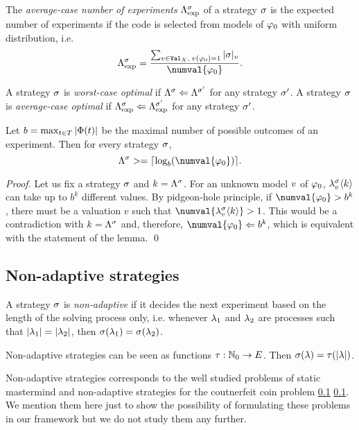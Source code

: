 The \emph{average-case number of experiments} $\Lambda^{\sigma}_\textrm{exp}$
  of a strategy $\sigma$ is the expected number of experiments if the code
  is selected from models of $\varphi_0$ with uniform distribution, i.e.
  \[
  \lenexp{\stg} = \frac{
    \sum_{\val\in\Val_\Var, \;\val(\init) = 1} \stglen{\stg}{\val}
    }{\numval{\init}}.
  \]
\medskip

\begin{definition}
A strategy $\sigma$ is \emph{worst-case optimal} if
  $\Lambda^{\sigma} <= \Lambda^{\sigma'}$ for any strategy $\sigma'$.
A strategy $\sigma$ is \emph{average-case optimal} if
  $\Lambda^{\sigma}_\textrm{exp} <= \Lambda^{\sigma'}_\textrm{exp}$ for any strategy $\sigma'$.
\end{definition}

\begin{lemma}
Let $b = \max_{t\in T} |\Phi(t)|$ be the maximal number of
  possible outcomes of an experiment. Then for every strategy $\sigma$,
  \[
  \lenmax{\stg} >= \lceil \log_b(\numval{\init}) \rceil.
  \]
\end{lemma}

\begin{proof}
Let us fix a strategy $\sigma$ and $k = \Lambda^{\sigma}$.
For an unknown model $v$ of $\varphi_0$,
  $\lambda^{\sigma}_{v}\langle k\rangle$ can take up to
  $b^k$ different values.
By pidgeon-hole principle, if $\numval{\init} > b^k$, there must be a valuation
  $v$ such that $\numval{\stgknow{\stg}{\val}{k}} > 1$.
This would be a contradiction with $k = \Lambda^{\sigma}$ and, therefore,
  $\numval{\init} <= b^k$, which is equivalent with the statement of the lemma.
  \qed
\end{proof}

\subsection{Non-adaptive strategies}
\begin{definition}
A strategy $\sigma$ is \emph{non-adaptive} if it decides the next experiment
  based on the length of the solving process only, i.e.
  whenever $\lambda_1$ and $\lambda_2$ are processes such that
  $|\lambda_1| = |\lambda_2|$,
  then
  $\sigma(\lambda_1) = \sigma(\lambda_2)$.

Non-adaptive strategies can be seen as functions $\tau: \mathbb{N}_0 -> E$.
Then $\sigma(\lambda) = \tau(|\lambda|)$.
\end{definition}

Non-adaptive strategies corresponds to the well studied problems of
  static mastermind and
  non-adaptive strategies for the coutnerfeit coin problem \ref{} \ref{}.
We mention them here just to show the possibility of formulating these problems
  in our framework but we do not study them any further.

